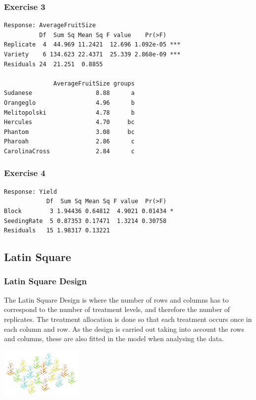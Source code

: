 \begin{frame}[fragile]\frametitle{Exercise 3}
\begin{verbatim}
Response: AverageFruitSize
          Df  Sum Sq Mean Sq F value    Pr(>F)
Replicate  4  44.969 11.2421  12.696 1.092e-05 ***
Variety    6 134.623 22.4371  25.339 2.868e-09 ***
Residuals 24  21.251  0.8855

              AverageFruitSize groups
Sudanese                  8.88      a
Orangeglo                 4.96      b
Melitopolski              4.78      b
Hercules                  4.70     bc
Phantom                   3.08     bc
Pharoah                   2.86      c
CarolinaCross             2.84      c
\end{verbatim}
\end{frame}


\begin{frame}[fragile]\frametitle{Exercise 4}
\begin{verbatim}
Response: Yield
            Df  Sum Sq Mean Sq F value  Pr(>F)
Block        3 1.94436 0.64812  4.9021 0.01434 *
SeedingRate  5 0.87353 0.17471  1.3214 0.30758
Residuals   15 1.98317 0.13221
\end{verbatim}
\end{frame}

\subsection{Latin Square}
\begin{frame}\frametitle{Latin Square Design}
The Latin Square Design is where the number of rows and columns has to correspond to the number of treatment levels,
and therefore the number of replicates. The treatment allocation is done so that each treatment occurs once in each
column and row. As the design is carried out taking into account the rows and columns, these are also fitted in the
model when analysing the data.

\vspace{1cm}
\centering
\includegraphics[width = 4cm]{LS}

\end{frame}




